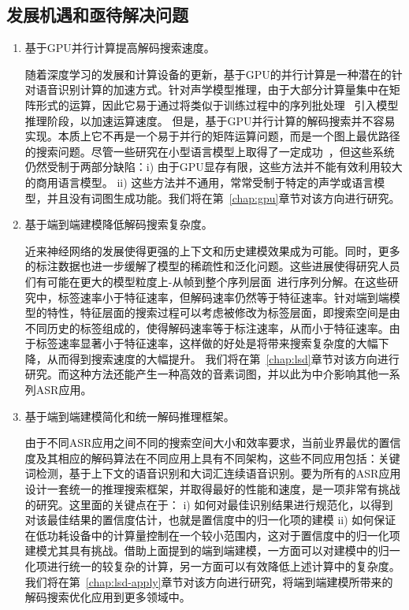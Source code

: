 \subsection{发展机遇和亟待解决问题}
\label{chap:intro2-dec-todo}
\begin{enumerate}
\item 基于GPU并行计算提高解码搜索速度。

随着深度学习的发展和计算设备的更新，基于GPU的并行计算是一种潜在的针对语音识别计算的加速方式。针对声学模型推理，由于大部分计算量集中在矩阵形式的运算，因此它易于通过将类似于训练过程中\cite{vesely2010parallel}的序列批处理~\cite{dixon2009harnessing} 引入模型推理阶段，以加速运算速度。
但是，基于GPU并行计算的解码搜索并不容易实现。本质上它不再是一个易于并行的矩阵运算问题，而是一个图上最优路径的搜索问题。尽管一些研究在小型语言模型上取得了一定成功~\cite{you2009parallel}，但这些系统仍然受制于两部分缺陷：i) 由于GPU显存有限，这些方法并不能有效利用较大的商用语言模型。
ii) 这些方法并不通用，常常受制于特定的声学或语言模型，并且没有词图生成功能。我们将在第~\ref{chap:gpu}章节对该方向进行研究。

\item 基于端到端建模降低解码搜索复杂度。

近来神经网络的发展使得更强的上下文和历史建模效果成为可能\cite{sak2014long,qian2016very}。同时，更多的标注数据也进一步缓解了模型的稀疏性和泛化问题。这些进展使得研究人员们有可能在更大的模型粒度上-从帧到整个序列层面~\cite{amodei2015deep,soltau2016neural,collobert2016wav2letter,sak2015fast,chan2016end}进行序列分解。在这些研究中，标签速率小于特征速率，但解码速率仍然等于特征速率。针对端到端模型的特性，特征层面的搜索过程可以考虑被修改为标签层面，即搜索空间是由不同历史的标签组成的，使得解码速率等于标注速率，从而小于特征速率。由于标签速率显著小于特征速率，这样做的好处是将带来搜索复杂度的大幅下降，从而得到搜索速度的大幅提升。
我们将在第~\ref{chap:lsd}章节对该方向进行研究。而这种方法还能产生一种高效的音素词图，并以此为中介影响其他一系列ASR应用。

\item 基于端到端建模简化和统一解码推理框架。

由于不同ASR应用之间不同的搜索空间大小和效率要求，当前业界最优的置信度及其相应的解码算法在不同应用上具有不同架构，这些不同应用包括：关键词检测，基于上下文的语音识别和大词汇连续语音识别。要为所有的ASR应用设计一套统一的推理搜索框架，并取得最好的性能和速度，是一项非常有挑战的研究。这里面的关键点在于： i) 如何对最佳识别结果进行规范化，以得到对该最佳结果的置信度估计，也就是置信度中的归一化项的建模   ii) 如何保证在低功耗设备中的计算量控制在一个较小范围内，这对于置信度中的归一化项建模尤其具有挑战。借助上面提到的端到端建模，一方面可以对建模中的归一化项进行统一的较复杂的计算，另一方面可以有效降低上述计算中的复杂度。我们将在第~\ref{chap:lsd-apply}章节对该方向进行研究，将端到端建模所带来的解码搜索优化应用到更多领域中。

\end{enumerate}
